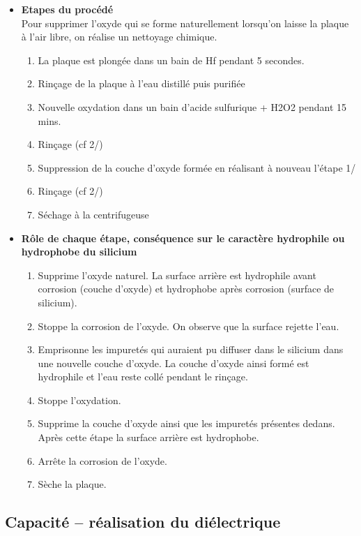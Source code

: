 \documentclass[11pt]{article}
\begin{document}
\begin{itemize}

\item \textbf{Etapes du proc\'ed\'e} \\ 
Pour supprimer l'oxyde qui se forme naturellement lorsqu'on laisse la plaque \`a l'air libre, on r\'ealise un nettoyage chimique.
\begin{enumerate}\itemsep -2pt
\item La plaque est plong\'ee dans un bain de Hf pendant 5 secondes.
\item Rinçage de la plaque \`a l'eau distill\'e puis purifi\'ee
\item Nouvelle oxydation dans un bain d'acide sulfurique + H2O2 pendant 15 mins. 
\item Rinçage (cf 2/)
\item Suppression de la couche d'oxyde form\'ee en r\'ealisant \`a nouveau l'\'etape 1/
\item Rin\c cage (cf 2/)
\item S\'echage \`a la centrifugeuse
\end{enumerate}

\item \textbf{R\^ole de chaque \'etape, cons\'equence sur le caract\`ere hydrophile ou hydrophobe du silicium}

\begin{enumerate}\itemsep -2pt
\item Supprime l'oxyde naturel. La surface arri\`ere est hydrophile avant corrosion (couche d'oxyde) et hydrophobe apr\`es corrosion (surface de silicium).
\item Stoppe la corrosion de l'oxyde. On observe que la surface rejette l'eau.
\item  Emprisonne les impuret\'es qui auraient pu diffuser dans le silicium dans une nouvelle couche d'oxyde. La couche d'oxyde ainsi form\'e est hydrophile et l'eau reste coll\'e pendant le rin\c cage.
\item Stoppe l'oxydation.
\item Supprime la couche d'oxyde ainsi que les impuret\'es pr\'esentes dedans. Apr\`es cette \'etape la surface arri\`ere est hydrophobe.
\item Arr\^ete la corrosion de l'oxyde. 
\item S\`eche la plaque.
\end{enumerate}

\end{itemize}

\subsection{Capacit\'e -- r\'ealisation du di\'electrique}
\end{document}
